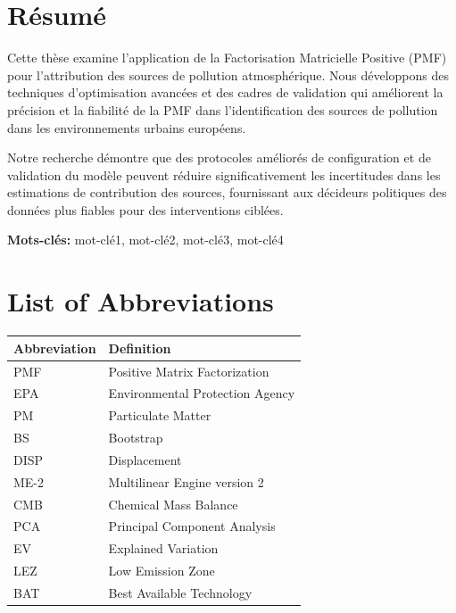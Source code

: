 \documentclass[
  letterpaper,
  oneside,
  openany]{MastersDoctoralThesis}
\begin{document}

\chapter*{Résumé}\label{ruxe9sumuxe9}


Cette thèse examine l'application de la Factorisation Matricielle
Positive (PMF) pour l'attribution des sources de pollution
atmosphérique. Nous développons des techniques d'optimisation avancées
et des cadres de validation qui améliorent la précision et la fiabilité
de la PMF dans l'identification des sources de pollution dans les
environnements urbains européens.

Notre recherche démontre que des protocoles améliorés de configuration
et de validation du modèle peuvent réduire significativement les
incertitudes dans les estimations de contribution des sources,
fournissant aux décideurs politiques des données plus fiables pour des
interventions ciblées.

\textbf{Mots-clés:} mot-clé1, mot-clé2, mot-clé3, mot-clé4

\clearpage
\begingroup
\hypersetup{linkcolor=blue}
\tableofcontents
\cleardoublepage
\listoffigures
\cleardoublepage
\listoftables
\endgroup

\cleardoublepage


\chapter*{List of Abbreviations}\label{list-of-abbreviations}


\begin{longtable}[]{@{}ll@{}}
\toprule\noalign{}
Abbreviation & Definition \\
\midrule\noalign{}
\endhead
\bottomrule\noalign{}
\endlastfoot
PMF & Positive Matrix Factorization \\
EPA & Environmental Protection Agency \\
PM & Particulate Matter \\
BS & Bootstrap \\
DISP & Displacement \\
ME-2 & Multilinear Engine version 2 \\
CMB & Chemical Mass Balance \\
PCA & Principal Component Analysis \\
EV & Explained Variation \\
LEZ & Low Emission Zone \\
BAT & Best Available Technology \\
\end{longtable}
\end{document}
